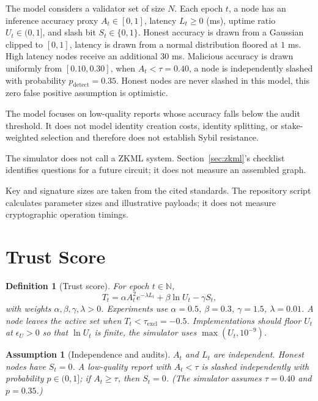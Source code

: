 \documentclass[conference]{IEEEtran}
\newtheorem{definition}{Definition}
\newtheorem{assumption}{Assumption}
\begin{document}
The model considers a validator set of size $N$. Each epoch $t$, a node has an inference accuracy proxy $A_t\in[0,1]$, latency $L_t\geq0$ (ms), uptime ratio $U_t\in(0,1]$, and slash bit $S_t\in\{0,1\}$. Honest accuracy is drawn from a Gaussian clipped to $[0,1]$, latency is drawn from a normal distribution floored at $1$ ms. High latency nodes receive an additional $30$ ms. Malicious accuracy is drawn uniformly from $[0.10,0.30]$, when $A_t<\tau=0.40$, a node is independently slashed with probability $p_{\mathrm{detect}}=0.35$. Honest nodes are never slashed in this model, this zero false positive assumption is optimistic.

The model focuses on low-quality reports whose accuracy falls below the audit threshold. It does not model identity creation costs, identity splitting, or stake-weighted selection and therefore does not establish Sybil resistance.

The simulator does not call a ZKML system. Section~\ref{sec:zkml}'s checklist identifies questions for a future circuit; it does not measure an assembled graph.

Key and signature sizes are taken from the cited standards. The repository script calculates parameter sizes and illustrative payloads; it does not measure cryptographic operation timings.

\section{Trust Score}
\label{sec:trust}

\begin{definition}[Trust score]
For epoch $t\in\mathbb{N}$,
\begin{equation}
  T_t = \alpha A_t^2 e^{-\lambda L_t} + \beta \ln U_t - \gamma S_t,
  \label{eq:trust}
\end{equation}
with weights $\alpha,\beta,\gamma,\lambda>0$. Experiments use $\alpha=0.5$, $\beta=0.3$, $\gamma=1.5$, $\lambda=0.01$. A node leaves the active set when $T_t < \tau_{\mathrm{excl}}=-0.5$. Implementations should floor $U_t$ at $\epsilon_U>0$ so that $\ln U_t$ is finite, the simulator uses $\max(U_t,10^{-9})$.
\end{definition}

\begin{assumption}[Independence and audits]
\label{ass:ind}
$A_t$ and $L_t$ are independent. Honest nodes have $S_t=0$. A low-quality report with $A_t<\tau$ is slashed independently with probability $p\in(0,1]$; if $A_t\ge\tau$, then $S_t=0$. (The simulator assumes $\tau=0.40$ and $p=0.35$.)
\end{assumption}
\end{document}
